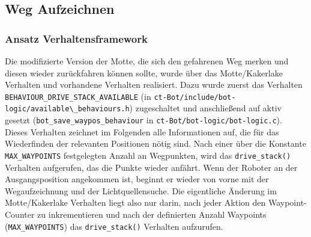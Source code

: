 \subsection{Weg Aufzeichnen}
\label{weg-aufzeichnen}

\subsubsection{Ansatz Verhaltensframework}
Die modifizierte Version der Motte, die sich den gefahrenen Weg merken und diesen
wieder zurückfahren können sollte, wurde über das Motte/Kakerlake Verhalten und
vorhandene Verhalten realisiert.
Dazu wurde zuerst das Verhalten \verb+BEHAVIOUR_DRIVE_STACK_AVAILABLE+ (in \verb+ct-Bot/include/bot-logic/available\_behaviours.h+) zugeschaltet und anschließend
auf aktiv gesetzt (\verb+bot_save_waypos_behaviour+ in
\verb+ct-Bot/bot-logic/bot-logic.c+). Dieses Verhalten zeichnet im Folgenden
alle Informationen auf, die für das Wiederfinden der relevanten Positionen nötig sind.
Nach einer über die Konstante \verb+MAX_WAYPOINTS+ festgelegten Anzahl an Wegpunkten,
wird das \verb+drive_stack()+ Verhalten aufgerufen, das die Punkte wieder anfährt.
Wenn der Roboter an der Ausgangsposition angekommen ist, beginnt er wieder von vorne mit
der Wegaufzeichnung und der Lichtquellensuche. Die eigentliche Änderung im
Motte/Kakerlake Verhalten liegt also nur darin, nach jeder Aktion den Waypoint-Counter
zu inkrementieren und nach der definierten Anzahl Waypoints (\verb+MAX_WAYPOINTS+) das
\verb+drive_stack()+ Verhalten aufzurufen.
